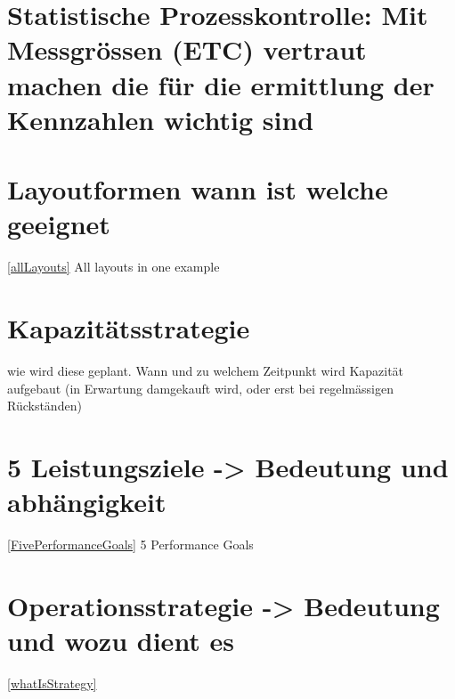 \section{Statistische Prozesskontrolle: Mit Messgr\"ossen (ETC) vertraut machen die f\"ur die ermittlung der Kennzahlen wichtig sind}

\section{Layoutformen wann ist welche geeignet}
\ref{allLayouts} All layouts in one example
\section{Kapazit\"atsstrategie}
wie wird diese geplant. Wann und zu welchem Zeitpunkt wird Kapazit\"at aufgebaut (in Erwartung damgekauft wird, oder erst bei regelm\"assigen R\"uckst\"anden)
\section{5 Leistungsziele -> Bedeutung und abh\"angigkeit}
\ref{FivePerformanceGoals} 5 Performance Goals
\section{Operationsstrategie -> Bedeutung und wozu dient es}
\ref{whatIsStrategy}